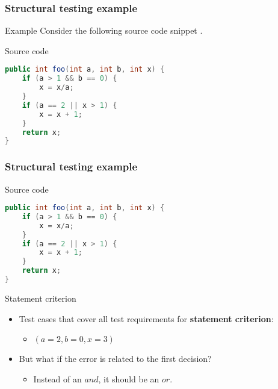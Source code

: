 \begin{frame}[hasprev=false, hasnext=true, fragile]
\frametitle{Structural testing example}
\label{example:structural-testing}

\begin{block}{Example}
Consider the following source code snippet \cite[p. 45]{myers:2004}.
\end{block}

\begin{block}{Source code}
\begin{lstlisting}[language=java]
public int foo(int a, int b, int x) {
	if (a > 1 && b == 0) {
		x = x/a;
	}
	if (a == 2 || x > 1) {
		x = x + 1;
	}
	return x;
}
\end{lstlisting}
\end{block}
\end{frame}


\begin{frame}[hasprev=true, hasnext=true, fragile]
\frametitle{Structural testing example}

\vspace{-.3cm}
\begin{block}{Source code}
\vspace{-.3cm}
\begin{lstlisting}[language=java]
public int foo(int a, int b, int x) {
	if (a > 1 && b == 0) {
		x = x/a;
	}
	if (a == 2 || x > 1) {
		x = x + 1;
	}
	return x;
}
\end{lstlisting}
\vspace{-.15cm}
\end{block}

\begin{block}{Statement criterion}
\begin{itemize}
	\item Test cases that cover all test requirements for \textbf{statement
	criterion}:
	\begin{itemize}
		\item $(a = 2, b = 0, x = 3)$
	\end{itemize}

	\item But what if the error is related to the first decision?
	\begin{itemize}
		\item Instead of an $and$, it should be an $or$.
	\end{itemize}
\end{itemize}
\end{block}
\end{frame}


